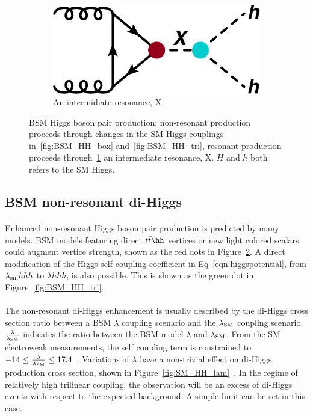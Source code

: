 \begin{figure}[h!]
\begin{subfigure}[b]{0.3\textwidth}
        \includegraphics[width=\textwidth]{figures/theory/BSM_HH_X}
        \caption{An intermidiate resonance, X}
        \label{fig:BSM_HH_X}
    \end{subfigure}
\caption{BSM Higgs boson pair production: non-resonant production proceeds through changes in the SM Higgs couplings in~\ref{fig:BSM_HH_box} and~\ref{fig:BSM_HH_tri}, resonant production proceeds through~\ref{fig:BSM_HH_X} an intermediate resonance, X. $H$ and $h$ both refers to the SM Higgs.}
\label{fig:BSM_HH}
\end{figure}

\subsection{BSM non-resonant di-Higgs}
\paragraph{}
Enhanced non-resonant Higgs boson pair production is predicted by many models. BSM models featuring direct $t\bar{t}\hh$ vertices \cite{Grober:2010yv, Contino:2012xk} or new light colored scalars \cite{PhysRevD.86.095023} could augment vertice strength, shown as the red dots in Figure~\ref{fig:BSM_HH}. 
A direct modification of the Higgs self-coupling coefficient in Eq~\ref{eqn:higgspotential}, from $\lambda_{\rm sm}hhh$ to $\lambda hhh$, is also possible. This is shown as the green dot in Figure~\ref{fig:BSM_HH_tri}. 

\paragraph{}
The non-resonant di-Higgs enhancement is usually described by the di-Higgs cross section ratio between a BSM $\lambda$ coupling scenario and the $\lambda_{\rm SM}$ coupling scenario.
$\frac{\rm \lambda}{\rm \lambda_{\rm SM}}$ indicates the ratio between the BSM model $\lambda$ and $\lambda_{\rm SM}$.
From the SM electroweak measurements, the self coupling term is constrained to $-14 \leq \frac{\rm \lambda}{\rm \lambda_{\rm SM}} \leq 17.4$~\cite{Kribs:2017znd}. 
Variations of $\lambda$ have a non-trivial effect on di-Higgs production cross section, shown in Figure~\ref{fig:SM_HH_lam}~\cite{Frederix:2014hta}. 
In the regime of relatively high trilinear coupling, the observation will be an excess of di-Higgs events with respect to the expected background. 
A simple limit can be set in this case.

